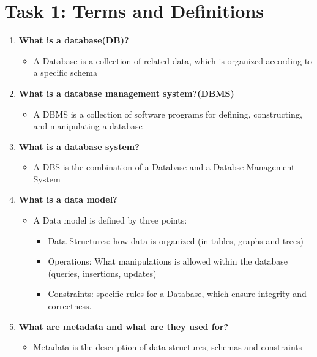 \documentclass{article}
\begin{document}
\section*{Task 1: Terms and Definitions}
\begin{enumerate}
	\item \textbf{What is a database(DB)?}
	
	\begin{itemize}
		\item A Database is a collection of related data, which is organized according to a specific schema
	\end{itemize}
	
	\item \textbf{What is a database management system?(DBMS)}
	\begin{itemize}
		\item A DBMS is a collection of software programs for defining, constructing, and manipulating a database
	\end{itemize}
	
	\item \textbf{What is a database system?}
	\begin{itemize}
		\item A DBS is the combination of a Database and a Databse Management System
	\end{itemize}
	
	\item \textbf{What is a data model?}
	\begin{itemize}
		\item A Data model is defined by three points:
		\begin{itemize}
			\item Data Structures: how data is organized (in tables, graphs and trees)
			\item Operations: What manipulations is allowed within the database (queries, insertions, updates)
			\item Constraints: specific rules for a Database, which ensure integrity and correctness.
		\end{itemize}
	\end{itemize}
	
	\item \textbf{What are metadata and what are they used for?}
	\begin{itemize}
		\item Metadata is the description of data structures, schemas and constraints
	\end{itemize}
\end{enumerate}
\end{document}
